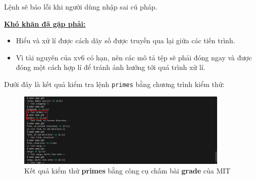 Lệnh sẽ báo lỗi khi người dùng nhập sai cú pháp.

\underline{\textbf{Khó khăn đã gặp phải:}}
\begin{itemize}[labelindent=1em, labelsep=0.2cm, leftmargin=1cm, wide=\parindent, topsep=0.1cm, itemsep=-1ex, partopsep=1.5ex, parsep=1.5ex]
	\item Hiểu và xử lí được cách dãy số được truyền qua lại giữa các tiến trình.
	\item Vì tài nguyên của xv6 có hạn, nên các mô tả tệp sẽ phải đóng ngay và được đóng một cách hợp lí để tránh ảnh hưởng tới quá trình xử lí.
\end{itemize}

Dưới đây là kết quả kiểm tra lệnh \verb|primes| bằng chương trình kiểm thử:
\begin{figure}[htp!]
	\centering
	\includegraphics[width=0.9\textwidth]{figures/primes-test}
	\caption{Kết quả kiểm thử \textbf{primes} bằng công cụ chấm bài \textbf{grade} của MIT}
\end{figure}
